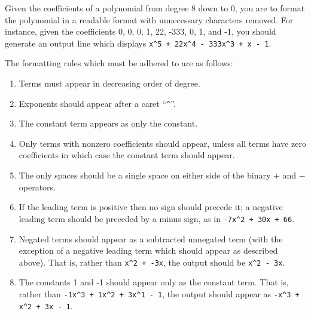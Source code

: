 


\pagestyle{contest}


\maketitle


Given the coefficients of a polynomial from degree 8 down to 0, you
are to format the polynomial in a readable format with unnecessary
characters removed.  For instance, given the coefficients 0, 0, 0, 1,
22, -333, 0, 1, and -1, you should generate an output line which
displays \verb|x^5 + 22x^4 - 333x^3 + x - 1|.

The formatting rules which must be adhered to are as follows:

\begin{enumerate}

\item Terms must appear in decreasing order of degree.

\item Exponents should appear after a caret ``\verb|^|''.

\item The constant term appears as only the constant.

\item Only terms with nonzero coefficients should appear, unless all terms
have zero coefficients in which case the constant term should appear.

\item The only spaces should be a single space on either side of the
binary $+$ and $-$ operators.
    
\item If the leading term is positive then no sign should precede it;
a negative leading term should be preceded by a minus sign, as in
\verb|-7x^2 + 30x + 66|.

\item Negated terms should appear as a subtracted unnegated term (with
the exception of a negative leading term which should appear as
described above).  That is, rather than \verb|x^2 + -3x|, the output
should be \verb|x^2 - 3x|.

\item The constants 1 and -1 should appear only as the constant
term.  That is, rather than \verb|-1x^3 + 1x^2 + 3x^1 - 1|, the output
should appear as \verb|-x^3 + x^2 + 3x - 1|.

\end{enumerate}

